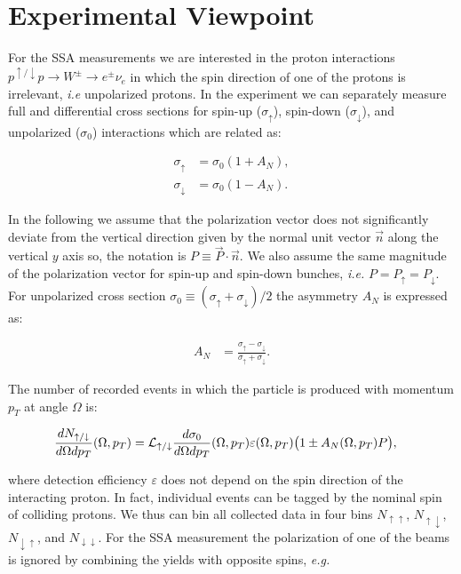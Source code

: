 \documentclass[12pt]{article}
\begin{document}


\section{Experimental Viewpoint}

For the SSA measurements we are interested in the proton interactions
$p^{\uparrow/\downarrow} p \to W^\pm \to e^\pm \nu_e$ in which the spin direction of one
of the protons is irrelevant, \textit{i.e} unpolarized protons. In the
experiment we can separately measure full and differential cross sections for
spin-up ($\sigma_\uparrow$), spin-down ($\sigma_\downarrow$), and unpolarized
($\sigma_0$) interactions which are related as:

\begin{align}
\sigma_\uparrow   &= \sigma_0 (1 + A_N ), \\
\sigma_\downarrow &= \sigma_0 (1 - A_N ).
\end{align}

In the following we assume that the polarization vector does not significantly
deviate from the vertical direction given by the normal unit vector $\vec n$
along the vertical $y$ axis so, the notation is $P \equiv \vec{P} \cdot
\vec{n}$. We also assume the same magnitude of the polarization vector for
spin-up and spin-down bunches, \textit{i.e.} $P = P_\uparrow = P_\downarrow$.
For unpolarized cross section $\sigma_0 \equiv (\sigma_\uparrow +
\sigma_\downarrow)/2$ the asymmetry $A_N$ is expressed as:

\begin{align}
\label{eq_anapower}
A_N &= \frac{\sigma_\uparrow - \sigma_\downarrow}{\sigma_\uparrow +
   \sigma_\downarrow}.
\end{align}

The number of recorded events in which the particle is produced with momentum
$p_T$ at angle $\Omega$ is:

\begin{align}
\frac{dN_{\uparrow/\downarrow}}{d\Omega dp_T}(\Omega, p_T) &=
   {\cal L}_{\uparrow/\downarrow} \frac{d\sigma_0}{d\Omega dp_T}(\Omega, p_T)
   \varepsilon(\Omega, p_T) \big( 1 \pm A_N(\Omega, p_T) P \big),
\label{eq:yield_diff}
\end{align}

\noindent
where detection efficiency $\varepsilon$ does not depend on the spin direction
of the interacting proton. In fact, individual events can be tagged by the
nominal spin of colliding protons. We thus can bin all collected data  in four
bins $N_{\uparrow\uparrow}$, $N_{\uparrow\downarrow}$,
$N_{\downarrow\uparrow}$, and $N_{\downarrow\downarrow}$. For the SSA
measurement the polarization of one of the beams is ignored by combining the
yields with opposite spins, \textit{e.g.}
\end{document}
